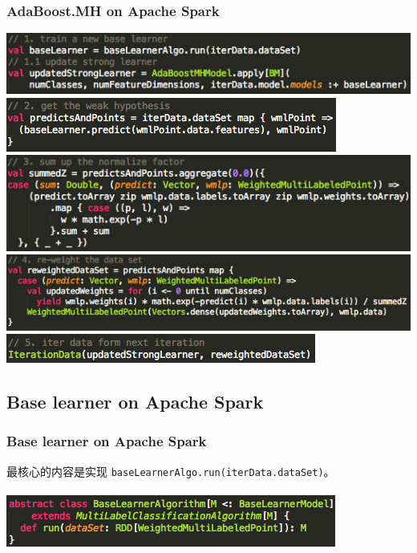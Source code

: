 \documentclass{beamer}
\begin{document}
\begin{frame}
\frametitle{AdaBoost.MH on Apache Spark}
\includegraphics[scale=0.5,left]{img/a1_train_base.png} \\
\includegraphics[scale=0.5,left]{img/a2_hypoth.png} \\
\includegraphics[scale=0.5,left]{img/a3_sumz.png} \\
\includegraphics[scale=0.5,left]{img/a4_reweighting.png} \\
\includegraphics[scale=0.5,left]{img/a5_nextiter.png} 
\end{frame}

\subsection{Base learner on Apache Spark}

\begin{frame}
\frametitle{Base learner on Apache Spark}
最核心的内容是实现 {\color{blue} \texttt{baseLearnerAlgo.run(iterData.dataSet)}}。 \\ \ \\
\includegraphics[scale=0.5,left]{img/base_algo.png}
\end{frame}
\end{document}
